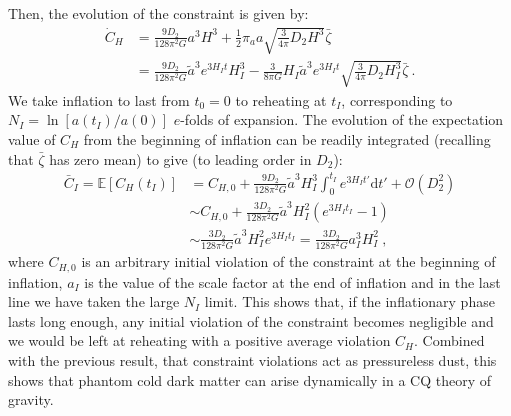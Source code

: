 \documentclass[amsmath,amssymb,11pt]{article}
\begin{document}
Then, the evolution  of the constraint is given by:
\begin{equation}
\begin{split}
    \dot{C}_H &= \frac{9 D_2}{128\pi^2 G} a^3 H^3 + \frac{1}{2} \pi_a a \sqrt{\frac{3}{4\pi}D_2 H^3} \bar{\zeta}  \\ 
    &= \frac{9 D_2 }{128\pi^2 G}\tilde{a}^3 e^{3H_I t} H_I^3 -  \frac{3}{8\pi G}H_I \tilde{a}^3 e^{3H_I t} \sqrt{\frac{3}{4\pi}D_2 H_I^3} \bar{\zeta} \ .
\end{split}
\end{equation}
We take inflation to last from $t_0=0$ to reheating at $t_I$, corresponding to $N_I = \ln[a(t_I)/a(0)]$ $e$-folds of expansion. The evolution of the expectation value of $C_H$ from the beginning of inflation can be readily integrated (recalling that $\bar{\zeta}$ has zero mean) to give (to leading order in $D_2$):
\begin{equation}
\begin{split}
    \bar{C}_I = \mathbb{E}[C_H(t_I) ] &= C_{H,0} +  \frac{9 D_2 }{128\pi^2 G}\tilde{a}^3 H_I^3 \int_{0}^{t_I} e^{3H_I t'} \text{d}t' + \mathcal{O}(D_2^2)\\
    &\sim C_{H,0} + \frac{3 D_2 }{128\pi^2 G}\tilde{a}^3 H_I^2 \left(e^{3H_I t_I}-1 \right)\\
    & \sim \frac{3 D_2 }{128\pi^2 G} \tilde{a}^3 H_I^2 e^{3H_I t_I} = \frac{3 D_2 }{128\pi^2 G} a_I^3 H_I^2 
    \ ,
\end{split}
\end{equation}
where $C_{H,0}$ is an arbitrary initial violation of the constraint at the beginning of inflation, $a_I$ is the value of the scale factor at the end of inflation and in the last line we have taken the large $N_I$ limit. This shows that, if the inflationary phase lasts long enough, any initial violation of the constraint becomes negligible and we would be left at reheating with a positive average violation $C_H$. Combined with the previous result, that constraint violations act as pressureless dust, this shows that phantom cold dark matter can arise dynamically in a CQ theory of gravity.
\end{document}
